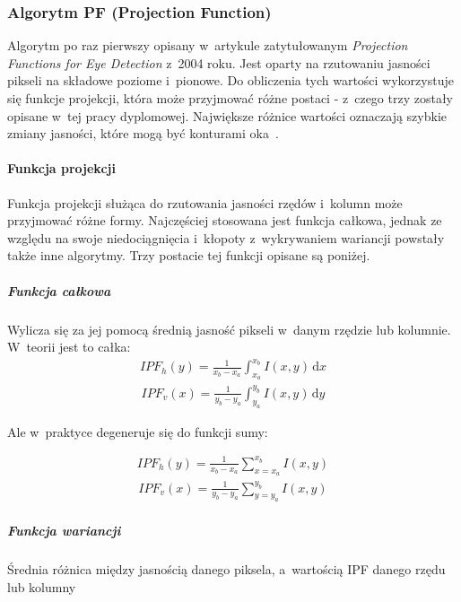








\subsubsection{Algorytm PF (Projection Function)}

Algorytm po raz pierwszy opisany w~artykule zatytułowanym \textit{Projection Functions for Eye Detection} \cite{projection_function} z~2004 roku. Jest oparty na rzutowaniu jasności pikseli na składowe poziome i~pionowe. Do obliczenia tych wartości wykorzystuje się funkcje projekcji, która może przyjmować różne postaci - z~czego trzy zostały opisane w~tej pracy dyplomowej. Największe różnice wartości oznaczają szybkie zmiany jasności, które mogą być konturami oka~\cite{EyePupilWebCam}.

\paragraph{Funkcja projekcji}

Funkcja projekcji służąca do rzutowania jasności rzędów i~kolumn może przyjmować różne formy. Najczęściej stosowana jest funkcja całkowa, jednak ze względu na swoje niedociągnięcia i~kłopoty z~wykrywaniem wariancji powstały także inne algorytmy. Trzy postacie tej funkcji opisane są poniżej.

\subparagraph{Funkcja całkowa} Wylicza się za jej pomocą średnią jasność pikseli w~danym rzędzie lub kolumnie. W~teorii jest to całka:
\begin{align}
    {IPF_h}(y) = \frac{1}{{x_b}-{x_a}}\int_{x_a}^{x_b} I(x,y) \, \mathrm{d}x
\end{align}
\begin{align}
    {IPF_v}(x) = \frac{1}{{y_b}-{y_a}}\int_{y_a}^{y_b} I(x,y) \, \mathrm{d}y
\end{align}

Ale w~praktyce degeneruje się do funkcji sumy:

\begin{align}
    {IPF_h}(y)=\frac{1}{{x_b}-{x_a}}\sum_{x={x_a}}^{{x_b}} I(x,y)
\end{align}
\begin{align}
    {IPF_v}(x)=\frac{1}{{y_b}-{y_a}}\sum_{y={y_a}}^{{y_b}} I(x,y)
\end{align}

\subparagraph{Funkcja wariancji} Średnia różnica między jasnością danego piksela, a~wartością IPF danego rzędu lub kolumny

